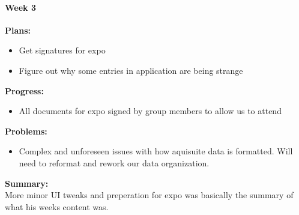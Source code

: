\paragraph{Week 3}
\begin{adjustwidth}{2.5em}{0pt}
    \vspace{-0.5cm}\textbf{Plans:}
    \vspace{-0.5cm}
    \begin{itemize}
        \item Get signatures for expo
        \item Figure out why some entries in application are being strange
    \end{itemize} 
    \vspace{-0.3cm}\textbf{Progress:}
    \vspace{-0.5cm}
    \begin{itemize}
        \item All documents for expo signed by group members to allow us to attend
    
    \end{itemize} 
    \vspace{-0.3cm}\textbf{Problems:}
    \vspace{-0.5cm}
    \begin{itemize}
        \item Complex and unforeseen issues with how aquisuite data is formatted. Will need to reformat and rework our data organization.
    \end{itemize}  
    \vspace{-0.3cm}\noindent\textbf{Summary:}\\
    \noindent More minor UI tweaks and preperation for expo was basically the summary of what his weeks content was.
\end{adjustwidth} 
